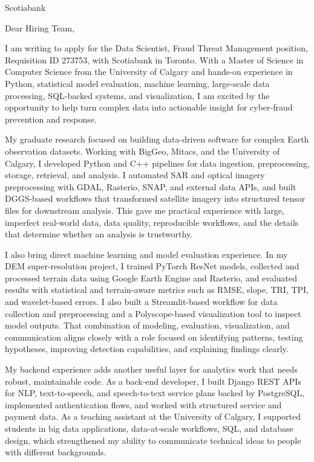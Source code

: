 \documentclass[11pt]{letter}
\begin{document}
\begin{letter}{Scotiabank}

\opening{Dear Hiring Team,}

I am writing to apply for the Data Scientist, Fraud Threat Management position, Requisition ID 273753, with Scotiabank in Toronto. With a Master of Science in Computer Science from the University of Calgary and hands-on experience in Python, statistical model evaluation, machine learning, large-scale data processing, SQL-backed systems, and visualization, I am excited by the opportunity to help turn complex data into actionable insight for cyber-fraud prevention and response.

My graduate research focused on building data-driven software for complex Earth observation datasets. Working with BigGeo, Mitacs, and the University of Calgary, I developed Python and C++ pipelines for data ingestion, preprocessing, storage, retrieval, and analysis. I automated SAR and optical imagery preprocessing with GDAL, Rasterio, SNAP, and external data APIs, and built DGGS-based workflows that transformed satellite imagery into structured tensor files for downstream analysis. This gave me practical experience with large, imperfect real-world data, data quality, reproducible workflows, and the details that determine whether an analysis is trustworthy.

I also bring direct machine learning and model evaluation experience. In my DEM super-resolution project, I trained PyTorch ResNet models, collected and processed terrain data using Google Earth Engine and Rasterio, and evaluated results with statistical and terrain-aware metrics such as RMSE, slope, TRI, TPI, and wavelet-based errors. I also built a Streamlit-based workflow for data collection and preprocessing and a Polyscope-based visualization tool to inspect model outputs. That combination of modeling, evaluation, visualization, and communication aligns closely with a role focused on identifying patterns, testing hypotheses, improving detection capabilities, and explaining findings clearly.

My backend experience adds another useful layer for analytics work that needs robust, maintainable code. As a back-end developer, I built Django REST APIs for NLP, text-to-speech, and speech-to-text service plans backed by PostgreSQL, implemented authentication flows, and worked with structured service and payment data. As a teaching assistant at the University of Calgary, I supported students in big data applications, data-at-scale workflows, SQL, and database design, which strengthened my ability to communicate technical ideas to people with different backgrounds.


\end{letter}
\end{document}
